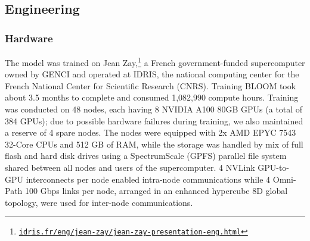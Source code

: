 \documentclass[twoside,11pt]{article}
\begin{document}


\subsection{Engineering}
\label{sec:engineering}

\subsubsection{Hardware}

The model was trained on Jean Zay,\footnote{\href{http://www.idris.fr/eng/jean-zay/jean-zay-presentation-eng.html}{\texttt{idris.fr/eng/jean-zay/jean-zay-presentation-eng.html}}} a French government-funded supercomputer owned by GENCI and operated at IDRIS, the national computing center for the French National Center for Scientific Research (CNRS).
Training BLOOM took about 3.5 months to complete and consumed 1,082,990 compute hours. Training was conducted on 48 nodes, each having 8 NVIDIA A100 80GB GPUs (a total of 384 GPUs); due to possible hardware failures during training, we also maintained a reserve of 4 spare nodes. The nodes were equipped with 2x AMD EPYC 7543 32-Core CPUs and 512 GB of RAM, while the storage was handled by mix of full flash and hard disk drives using a SpectrumScale (GPFS) parallel file system shared between all nodes and users of the supercomputer. 4 NVLink GPU-to-GPU interconnects per node enabled intra-node communications while 4 Omni-Path 100 Gbps links per node, arranged in an enhanced hypercube 8D global topology, were used for inter-node communications.
\end{document}

